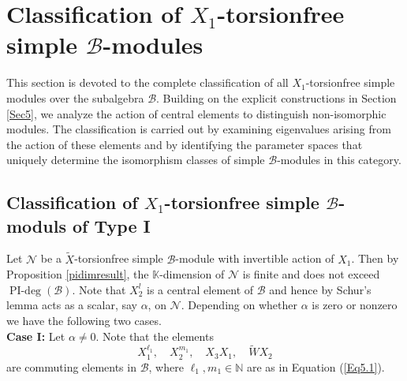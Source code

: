 \documentclass[12 pt,reqno]{amsart}
\numberwithin{equation}{section}
\newcommand{\B}{\mathcal{B}}
\DeclareMathOperator{\pideg}{PI-deg}
\theoremstyle{definition}
\theoremstyle{definition}
\theoremstyle{remark}
\theoremstyle{remark}
\begin{document}
\section{\texorpdfstring{Classification of $X_1$-torsionfree simple $\mathcal{B}$-modules}{}}
This section is devoted to the complete classification of all $ X_1$-torsionfree simple modules over the subalgebra $ \mathcal{B} $. Building on the explicit constructions in Section \ref{Sec5}, we analyze the action of central elements to distinguish non-isomorphic modules. The classification is carried out by examining eigenvalues arising from the action of these elements and by identifying the parameter spaces that uniquely determine the isomorphism classes of simple $ \mathcal{B}  $-modules in this category.

\subsection{\texorpdfstring{Classification of $X_1$-torsionfree simple $\mathcal{B}$-moduls of Type I}{} }
Let $\mathcal{N}$ be a $\tilde{X}$-torsionfree simple $\B$-module with invertible action of $X_1$. Then by Proposition \ref{pidimresult}, the $\mathbb{K}$-dimension of $\mathcal{N}$ is finite and does not exceed $\pideg\left(\B\right)$. Note that $X_2^l$ is a central element of $\B$ and hence by Schur's lemma acts as a scalar, say $\alpha$, on $\mathcal{N}$. Depending on whether $\alpha$ is zero or nonzero we have the following two cases.\\
\textbf{Case I:} Let $\alpha \neq 0$. Note that the elements 
\begin{equation}\label{e3}
    X_1^{\ell_1}, \quad X_2^{m_1},\quad X_3X_1, \quad \tilde{W}X_2
\end{equation} are commuting elements in $\B$, where $ \ell_1, m_1 \in \mathbb{N} $ are as in Equation (\ref{Eq5.1}).  
\end{document}
